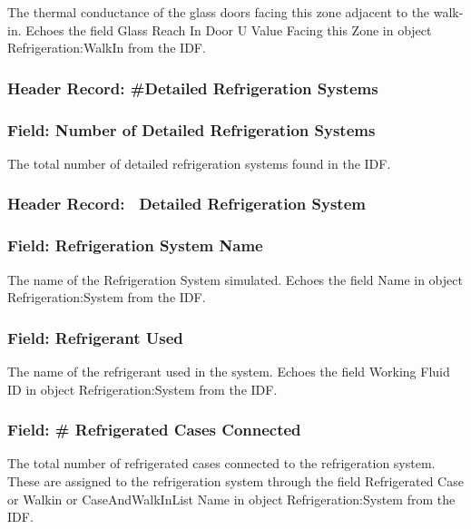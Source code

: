 The thermal conductance of the glass doors facing this zone adjacent to the walk-in. Echoes the field Glass Reach In Door U Value Facing this Zone in object Refrigeration:WalkIn from the IDF.

\subsubsection{Header Record: \#Detailed Refrigeration Systems}\label{header-record-detailed-refrigeration-systems}

\subsubsection{Field: Number of Detailed Refrigeration Systems}\label{field-number-of-detailed-refrigeration-systems}

The total number of detailed refrigeration systems found in the IDF.

\subsubsection{Header Record:~ Detailed Refrigeration System}\label{header-record-detailed-refrigeration-system}

\subsubsection{Field: Refrigeration System Name}\label{field-refrigeration-system-name}

The name of the Refrigeration System simulated. Echoes the field Name in object Refrigeration:System from the IDF.

\subsubsection{Field: Refrigerant Used}\label{field-refrigerant-used}

The name of the refrigerant used in the system. Echoes the field Working Fluid ID in object Refrigeration:System from the IDF.

\subsubsection{Field: \# Refrigerated Cases Connected}\label{field-refrigerated-cases-connected-1}

The total number of refrigerated cases connected to the refrigeration system. These are assigned to the refrigeration system through the field Refrigerated Case or Walkin or CaseAndWalkInList Name in object Refrigeration:System from the IDF.

